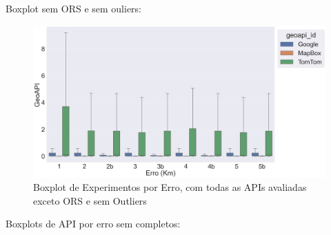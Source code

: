 Boxplot sem ORS e sem ouliers:

\begin{figure}[h]
    \centering
    \includegraphics[width=\textwidth]{Figuras/boxplotExperimentoSemOutSemORS.png}
    \caption{Boxplot de Experimentos por Erro, com todas as APIs avaliadas exceto ORS e sem Outliers}
    \label{fig:boxplot-semors-semout}
\end{figure}

Boxplots de API por erro sem completos:

